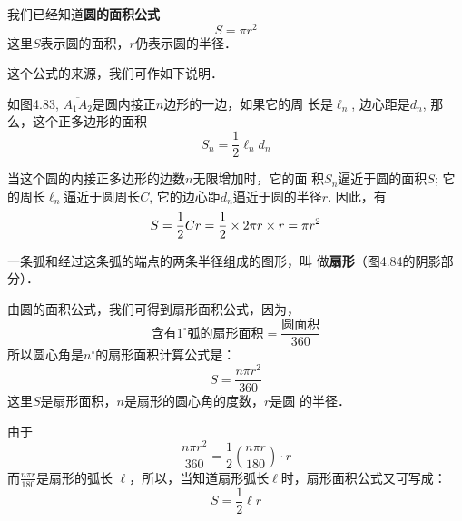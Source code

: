 我们已经知道\textbf{圆的面积公式}
\[S=\pi r^2\]
这里$S$表示圆的面积，$r$仍表示圆的半径．

这个公式的来源，我们可作如下说明．

如图4.83, $\overline{A_1A_2}$是圆内接正$n$边形的一边，如果它的周
长是$\ell_n$, 边心距是$d_n$, 
那么，这个正多边形的面积
\[S_n=\frac{1}{2}\ell_nd_n\]

当这个圆的内接正多边形的边数$n$无限增加时，它的面
积$S_n$逼近于圆的面积$S$; 它的周长$\ell_n$逼近于圆周长$C$, 
它的边心距$d_n$逼近于圆的半径$r$. 因此，有
\[S=\dfrac{1}{2}Cr=\dfrac{1}{2}\times 2\pi r\times r=\pi r^2\]

一条弧和经过这条弧的端点的两条半径组成的图形，叫
做\textbf{扇形}（图4.84的阴影部分）．

\begin{figure}[htp]\centering
  \begin{minipage}[t]{0.48\textwidth}
  \centering
{}
  \caption{}
  \end{minipage}
  \begin{minipage}[t]{0.48\textwidth}
  \centering
  \caption{}
  \end{minipage}
  \end{figure}

由圆的面积公式，我们可得到扇形面积公式，因为，
\[\text{含有$1^{\circ}$弧的扇形面积}=\frac{\text{圆面积}}{360}\]
所以圆心角是$n^{\circ}$的扇形面积计算公式是：
\[S=\frac{n\pi r^2}{360}\]
这里$S$是扇形面积，$n$是扇形的圆心角的度数，$r$是圆
的半径．

由于
\[\frac{n\pi r^2}{360}=\frac{1}{2}\left(\frac{n\pi r}{180}\right)\cdot r\]
而$\frac{n\pi r}{180}$是扇形的弧长
$\ell$，所以，当知道扇形弧长$\ell$时，扇形面积公式又可写成：
\[S=\frac{1}{2}\ell r\]

